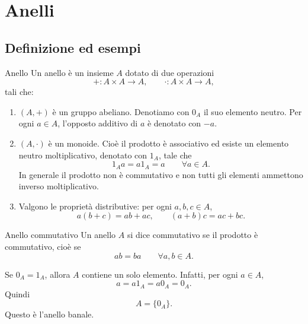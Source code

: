 \documentclass[a4paper]{article}
\begin{document}
\section{Anelli}

\subsection{Definizione ed esempi}

\begin{radioactive}
\begin{snippetdefinition}{Anello}
    Un anello è un insieme \(A\) dotato di due operazioni
    \[
        + \colon A \times A \to A,
        \qquad
        \cdot \colon A \times A \to A,
    \]
    tali che:

    \begin{enumerate}
        \item \((A,+)\) è un gruppo abeliano.
        Denotiamo con \(0_A\) il suo elemento neutro.
        Per ogni \(a \in A\), l'opposto additivo di \(a\) è denotato con \(-a\).

        \item \((A,\cdot)\) è un monoide.
        Cioè il prodotto è associativo ed esiste un elemento neutro moltiplicativo, denotato con \(1_A\), tale che
        \[
            1_Aa=a1_A=a
            \qquad
            \forall a \in A.
        \]
        In generale il prodotto non è commutativo e non tutti gli elementi ammettono inverso moltiplicativo.

        \item Valgono le proprietà distributive:
        per ogni \(a,b,c \in A\),
        \[
            a(b+c)=ab+ac,
            \qquad
            (a+b)c=ac+bc.
        \]
    \end{enumerate}
\end{snippetdefinition}
\end{radioactive}

\begin{radioactive}
\begin{snippetdefinition}{Anello commutativo}
    Un anello \(A\) si dice commutativo se il prodotto è commutativo, cioè se
    \[
        ab=ba
        \qquad
        \forall a,b \in A.
    \]
\end{snippetdefinition}
\end{radioactive}

\begin{radioactive}
Se \(0_A=1_A\), allora \(A\) contiene un solo elemento.
Infatti, per ogni \(a \in A\),
\[
    a
    =
    a1_A
    =
    a0_A
    =
    0_A.
\]
Quindi
\[
    A=\{0_A\}.
\]
Questo è l'anello banale.
\end{radioactive}
\end{document}
